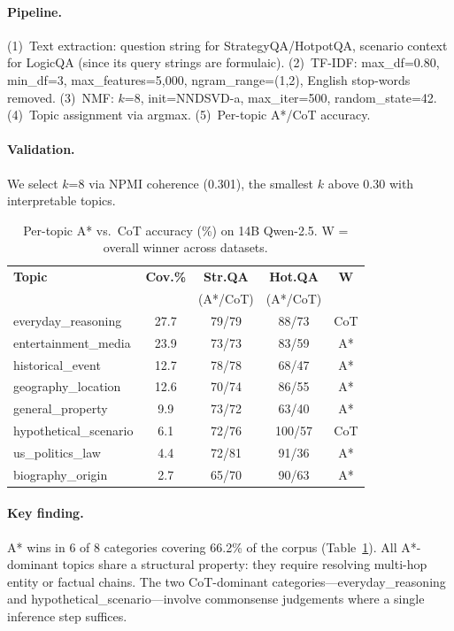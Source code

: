 \documentclass[10pt]{article}
\begin{document}
\paragraph{Pipeline.} (1)~Text extraction: question string for StrategyQA/HotpotQA, scenario context for LogicQA (since its query strings are formulaic). (2)~TF-IDF: max\_df=0.80, min\_df=3, max\_features=5,000, ngram\_range=(1,2), English stop-words removed. (3)~NMF: $k$=8, init=NNDSVD-a, max\_iter=500, random\_state=42. (4)~Topic assignment via argmax. (5)~Per-topic A*/CoT accuracy.

\paragraph{Validation.} We select $k$=8 via NPMI coherence (0.301), the smallest $k$ above 0.30 with interpretable topics.

\begin{table}[ht]
\centering
\small
\setlength{\tabcolsep}{3pt}
\begin{tabular}{lcccc}
\toprule
\textbf{Topic} & \textbf{Cov.\%} & \textbf{Str.QA} & \textbf{Hot.QA} & \textbf{W} \\
& & (A*/CoT) & (A*/CoT) & \\
\midrule
everyday\_reasoning & 27.7 & 79/79 & 88/73 & CoT \\
entertainment\_media & 23.9 & 73/73 & 83/59 & A* \\
historical\_event & 12.7 & 78/78 & 68/47 & A* \\
geography\_location & 12.6 & 70/74 & 86/55 & A* \\
general\_property & 9.9 & 73/72 & 63/40 & A* \\
hypothetical\_scenario & 6.1 & 72/76 & 100/57 & CoT \\
us\_politics\_law & 4.4 & 72/81 & 91/36 & A* \\
biography\_origin & 2.7 & 65/70 & 90/63 & A* \\
\bottomrule
\end{tabular}
\caption{Per-topic A* vs.\ CoT accuracy (\%) on 14B Qwen-2.5. W = overall winner across datasets.}
\label{tab:topic_results}
\end{table}

\paragraph{Key finding.} A* wins in 6 of 8 categories covering 66.2\% of the corpus (Table~\ref{tab:topic_results}). All A*-dominant topics share a structural property: they require resolving multi-hop entity or factual chains. The two CoT-dominant categories---everyday\_reasoning and hypothetical\_scenario---involve commonsense judgements where a single inference step suffices.
\end{document}
